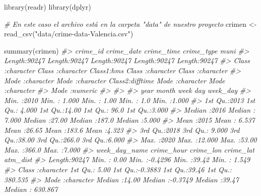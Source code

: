 \documentclass[
]{book}
\newenvironment{Shaded}{\begin{snugshade}}{\end{snugshade}}
\newcommand{\CommentTok}[1]{\textcolor[rgb]{0.56,0.35,0.01}{\textit{#1}}}
\newcommand{\FunctionTok}[1]{\textcolor[rgb]{0.00,0.00,0.00}{#1}}
\newcommand{\NormalTok}[1]{#1}
\newcommand{\OtherTok}[1]{\textcolor[rgb]{0.56,0.35,0.01}{#1}}
\newcommand{\StringTok}[1]{\textcolor[rgb]{0.31,0.60,0.02}{#1}}
\begin{document}
\begin{Shaded}
\begin{Highlighting}[]
\FunctionTok{library}\NormalTok{(readr)}
\FunctionTok{library}\NormalTok{(dplyr)}

\CommentTok{\# En este caso el archivo está en la carpeta "data" de nuestro proyecto}
\NormalTok{crimen }\OtherTok{\textless{}{-}} \FunctionTok{read\_csv}\NormalTok{(}\StringTok{"data/crime{-}data{-}Valencia.csv"}\NormalTok{)}


\FunctionTok{summary}\NormalTok{(crimen)}
\CommentTok{\#\textgreater{}    crime\_id          crime\_date         crime\_time        crime\_type            muni          }
\CommentTok{\#\textgreater{}  Length:90247       Length:90247       Length:90247      Length:90247       Length:90247      }
\CommentTok{\#\textgreater{}  Class :character   Class :character   Class1:hms        Class :character   Class :character  }
\CommentTok{\#\textgreater{}  Mode  :character   Mode  :character   Class2:difftime   Mode  :character   Mode  :character  }
\CommentTok{\#\textgreater{}                                        Mode  :numeric                                         }
\CommentTok{\#\textgreater{}                                                                                               }
\CommentTok{\#\textgreater{}                                                                                               }
\CommentTok{\#\textgreater{}       year          month             week            day           week\_day    }
\CommentTok{\#\textgreater{}  Min.   :2010   Min.   : 1.000   Min.   : 1.00   Min.   :  1.0   Min.   :1.000  }
\CommentTok{\#\textgreater{}  1st Qu.:2013   1st Qu.: 4.000   1st Qu.:14.00   1st Qu.: 96.0   1st Qu.:3.000  }
\CommentTok{\#\textgreater{}  Median :2016   Median : 7.000   Median :27.00   Median :187.0   Median :5.000  }
\CommentTok{\#\textgreater{}  Mean   :2015   Mean   : 6.537   Mean   :26.65   Mean   :183.6   Mean   :4.323  }
\CommentTok{\#\textgreater{}  3rd Qu.:2018   3rd Qu.: 9.000   3rd Qu.:38.00   3rd Qu.:266.0   3rd Qu.:6.000  }
\CommentTok{\#\textgreater{}  Max.   :2020   Max.   :12.000   Max.   :53.00   Max.   :366.0   Max.   :7.000  }
\CommentTok{\#\textgreater{}  week\_day\_name        crime\_hour      crime\_lon         crime\_lat        atm\_dist       }
\CommentTok{\#\textgreater{}  Length:90247       Min.   : 0.00   Min.   :{-}0.4296   Min.   :39.42   Min.   :   1.549  }
\CommentTok{\#\textgreater{}  Class :character   1st Qu.: 5.00   1st Qu.:{-}0.3883   1st Qu.:39.46   1st Qu.: 380.535  }
\CommentTok{\#\textgreater{}  Mode  :character   Median :14.00   Median :{-}0.3749   Median :39.47   Median : 630.867  }

\end{Highlighting}
\end{Shaded}
\end{document}
